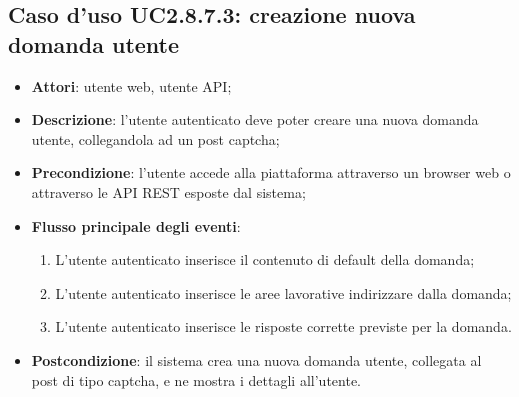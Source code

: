 \subsection{Caso d'uso UC2.8.7.3: creazione nuova domanda utente}
\begin{itemize}
\item \textbf{Attori}: utente web, utente API;
\item \textbf{Descrizione}: l'utente autenticato deve poter creare una nuova domanda utente, collegandola ad un post captcha; 
      \item \textbf{Precondizione}: l'utente accede alla piattaforma attraverso un browser web o attraverso le API REST esposte dal sistema;

        \item \textbf{Flusso principale degli eventi}:
          \begin{enumerate}
          \item L'utente autenticato inserisce il contenuto di default della domanda;
          \item L'utente autenticato inserisce le aree lavorative indirizzare dalla domanda;
          \item L'utente autenticato inserisce le risposte corrette previste per la domanda.

      \end{enumerate}
    \item \textbf{Postcondizione}: il sistema crea una nuova domanda utente, collegata al post di tipo captcha, e ne mostra i dettagli all'utente.
  \end{itemize}
\hypertarget{UC2.8.7.4}{}
